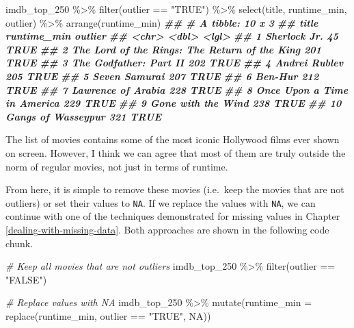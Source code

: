 \documentclass[
]{book}
\newenvironment{Shaded}{\begin{snugshade}}{\end{snugshade}}
\newcommand{\AttributeTok}[1]{\textcolor[rgb]{0.77,0.63,0.00}{#1}}
\newcommand{\CommentTok}[1]{\textcolor[rgb]{0.56,0.35,0.01}{\textit{#1}}}
\newcommand{\ConstantTok}[1]{\textcolor[rgb]{0.00,0.00,0.00}{#1}}
\newcommand{\DocumentationTok}[1]{\textcolor[rgb]{0.56,0.35,0.01}{\textbf{\textit{#1}}}}
\newcommand{\FunctionTok}[1]{\textcolor[rgb]{0.00,0.00,0.00}{#1}}
\newcommand{\NormalTok}[1]{#1}
\newcommand{\SpecialCharTok}[1]{\textcolor[rgb]{0.00,0.00,0.00}{#1}}
\newcommand{\StringTok}[1]{\textcolor[rgb]{0.31,0.60,0.02}{#1}}
\begin{document}
\begin{Shaded}
\begin{Highlighting}[]
\NormalTok{imdb\_top\_250 }\SpecialCharTok{\%\textgreater{}\%}
  \FunctionTok{filter}\NormalTok{(outlier }\SpecialCharTok{==} \StringTok{"TRUE"}\NormalTok{) }\SpecialCharTok{\%\textgreater{}\%}
  \FunctionTok{select}\NormalTok{(title, runtime\_min, outlier) }\SpecialCharTok{\%\textgreater{}\%}
  \FunctionTok{arrange}\NormalTok{(runtime\_min)}
\DocumentationTok{\#\# \# A tibble: 10 x 3}
\DocumentationTok{\#\#    title                                         runtime\_min outlier}
\DocumentationTok{\#\#    \textless{}chr\textgreater{}                                               \textless{}dbl\textgreater{} \textless{}lgl\textgreater{}  }
\DocumentationTok{\#\#  1 Sherlock Jr.                                           45 TRUE   }
\DocumentationTok{\#\#  2 The Lord of the Rings: The Return of the King         201 TRUE   }
\DocumentationTok{\#\#  3 The Godfather: Part II                                202 TRUE   }
\DocumentationTok{\#\#  4 Andrei Rublev                                         205 TRUE   }
\DocumentationTok{\#\#  5 Seven Samurai                                         207 TRUE   }
\DocumentationTok{\#\#  6 Ben{-}Hur                                               212 TRUE   }
\DocumentationTok{\#\#  7 Lawrence of Arabia                                    228 TRUE   }
\DocumentationTok{\#\#  8 Once Upon a Time in America                           229 TRUE   }
\DocumentationTok{\#\#  9 Gone with the Wind                                    238 TRUE   }
\DocumentationTok{\#\# 10 Gangs of Wasseypur                                    321 TRUE}
\end{Highlighting}
\end{Shaded}

The list of movies contains some of the most iconic Hollywood films ever shown on screen. However, I think we can agree that most of them are truly outside the norm of regular movies, not just in terms of runtime.

From here, it is simple to remove these movies (i.e.~keep the movies that are not outliers) or set their values to \texttt{NA}. If we replace the values with \texttt{NA}, we can continue with one of the techniques demonstrated for missing values in Chapter \ref{dealing-with-missing-data}. Both approaches are shown in the following code chunk.

\begin{Shaded}
\begin{Highlighting}[]
\CommentTok{\# Keep all movies that are not outliers}
\NormalTok{imdb\_top\_250 }\SpecialCharTok{\%\textgreater{}\%}
  \FunctionTok{filter}\NormalTok{(outlier }\SpecialCharTok{==} \StringTok{"FALSE"}\NormalTok{)}

\CommentTok{\# Replace values with NA}
\NormalTok{imdb\_top\_250 }\SpecialCharTok{\%\textgreater{}\%}
  \FunctionTok{mutate}\NormalTok{(}\AttributeTok{runtime\_min =} \FunctionTok{replace}\NormalTok{(runtime\_min, outlier }\SpecialCharTok{==} \StringTok{"TRUE"}\NormalTok{, }\ConstantTok{NA}\NormalTok{))}
\end{Highlighting}
\end{Shaded}
\end{document}
